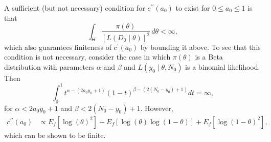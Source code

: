 \documentclass[a4paper, notitlepage, 11pt]{article}
\begin{document}
A sufficient (but not necessary) condition for $c^{\prime\prime}(a_0)$ to exist for $ 0 \leq a_0 \leq 1$ is that 
\[\int_{\Theta} \frac{\pi(\theta)}{[L(D_0 \mid \theta)]^2}  \, d\theta < \infty, \]
which also guarantees finiteness of $c^\prime(a_0)$ by bounding it above.
To see that this condition is not necessary, consider the case in which $\pi(\theta)$ is a Beta distribution with parameters $\alpha$ and $\beta$ and $L( y_0  \mid \theta, N_0)$ is a binomial likelihood.
Then 
\[ \int_0^1 t^{\alpha - (2 a_0 y_0 + 1)} (1-t)^{\beta - (2(N_0-y_0) + 1)} dt = \infty,\]
for $\alpha < 2 a_0 y_0 + 1$ and $\beta < 2(N_0-y_0) + 1$.
However,
\begin{align*}
 c^{\prime\prime}(a_0) &\propto E_f[\log(\theta)^2] + E_f[\log(\theta)\log(1-\theta)] + E_f[\log(1-\theta)^2],
\end{align*}
which can be shown to be finite.
\end{document}
